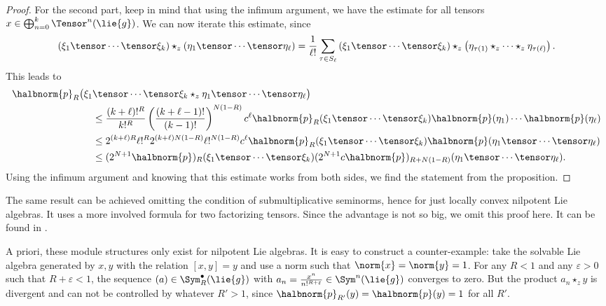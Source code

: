 \documentclass[
11pt,                          %
english                        %
]{article}
\begin{document}
\begin{proof}
	For the second part, keep in mind that using the infimum argument, we have the 
	estimate for all tensors $x \in \bigoplus_{n=0}^k \Tensor^n(\lie{g})$. We can 
	now iterate this estimate, since
	\begin{equation*}
		\left( \xi_1 \tensor \cdots \tensor \xi_k \right)
		\star_z
		\left( \eta_1 \tensor \cdots \tensor \eta_\ell \right)
		=
		\frac{1}{\ell!}
		\sum\limits_{\tau \in S_\ell}
		\left( \xi_1 \tensor \cdots \tensor \xi_k \right)
		\star_z
		\left( \eta_{\tau(1)} \star_z \cdots \star_z \eta_{\tau(\ell)} \right).
	\end{equation*}
	This leads to
	\begin{align*}
		\halbnorm{p}_R
		\big(
			\xi_1
		&	
			 \tensor \cdots \tensor \xi_k 
			 \star_z 
			 \eta_1 \tensor \cdots \tensor \eta_\ell
		\big)
		\\
		& \leq
		\frac{(k + \ell)!^R}{k!^R}
		\left(
			\frac{(k + \ell - 1)!}{(k - 1)!}
		\right)^{N (1 - R)}
		c^\ell
		\halbnorm{p}_R( \xi_1 \tensor \cdots \tensor \xi_k )
		\halbnorm{p}( \eta_1 ) \cdots \halbnorm{p} ( \eta_\ell )
		\\
		& \leq
		2^{(k + \ell) R}
		\ell!^R
		2^{(k + \ell) N (1 - R)}
		\ell!^{N (1 - R)}
		c^\ell
		\halbnorm{p}_R( \xi_1 \tensor \cdots \tensor \xi_k )
		\halbnorm{p}( \eta_1 \tensor \cdots \tensor \eta_\ell )
		\\
		& \leq
		(2^{N + 1} \halbnorm{p})_R
		( \xi_1 \tensor \cdots \tensor \xi_k )
		(2^{N + 1} c \halbnorm{p})_{R + N (1 - R)}
		( \eta_1 \tensor \cdots \tensor \eta_\ell ).
	\end{align*}
	Using the infimum argument and knowing that this estimate works from both sides,
	we find the statement from the proposition.
\end{proof}
\begin{remark}
	The same result can be achieved omitting the condition of submultiplicative 
	seminorms, hence for just locally convex nilpotent Lie algebras. It uses a more 
	involved formula for two factorizing tensors. Since the advantage is not so big,
	we omit this proof here. It can be found in \cite{stapor:2015a}.
\end{remark}
A priori, these module structures only exist for nilpotent Lie algebras. It is easy 
to construct a counter-example: take the solvable Lie algebra generated by $x, y$ 
with the relation $[x,y] = y$ and use a norm such that $\norm{x} = \norm{y} = 1$. 
For any $R < 1$ and any $\varepsilon > 0$ such that $R + \varepsilon < 1$, the 
sequence $(a) \in \Sym_R^{\bullet}(\lie{g})$ with $a_n = \frac{x^n}{n!^{R + 
\varepsilon}} \in \Sym^n(\lie{g})$ converges to zero. But the product $a_n \star_z 
y$ is divergent and can not be controlled by whatever $R' > 1$, since 
$\halbnorm{p}_{R'}(y) = \halbnorm{p}(y) = 1$ for all $R'$.
\end{document}
